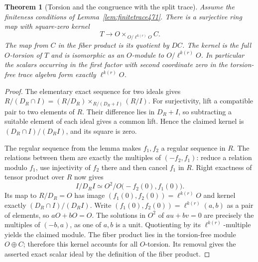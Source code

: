 \documentclass[a4paper,11pt]{article}
\newtheorem{theorem}[proposition]{Theorem}
\theoremstyle{definition}
\theoremstyle{remark}
\numberwithin{equation}{section}
\begin{document}
\begin{theorem}[Torsion and the congruence with the split trace]\leavevmode
\label{thm:congruenceorder471}
Assume the finiteness conditions of Lemma~\ref{lem:finitetrace471}.
There is a surjective ring map with square-zero kernel
\[
       T\longrightarrow O\times_{\,O/\ell^{k(r)}O} C .
\]
The map from \(C\) in the fiber product is its quotient by \(DC\).
The kernel is the full \(O\)-torsion of \(T\) and is isomorphic
as an \(O\)-module to \(O/\ell^{k(r)}O\). In particular the
scalars occurring in the first factor with second coordinate zero
in the torsion-free trace algebra form exactly \(\ell^{k(r)}O\).
\end{theorem}
\begin{proof}
The elementary exact sequence for two ideals gives
\(R/(D_R\cap I)=(R/D_R)\times_{R/(D_R+I)}(R/I)\).
For surjectivity, lift a compatible pair to two elements of \(R\).
Their difference lies in \(D_R+I\), so subtracting a suitable
element of each ideal gives a common lift. Hence the claimed
kernel is \((D_R\cap I)/(D_R I)\), and its square is zero.

The regular sequence from the lemma makes \(f_1,f_2\) a regular
sequence in \(R\). The relations between them are exactly the
multiples of \((-f_2,f_1)\): reduce a relation modulo \(f_1\),
use injectivity of \(f_2\) there and then cancel \(f_1\) in \(R\).
Right exactness of tensor product over \(R\) now gives
\[
 I/D_R I \simeq
    O^2/O\big(-f_2(0),f_1(0)\big).
\]
Its map to \(R/D_R=O\) has image \((f_1(0),f_2(0))=\ell^{k(r)}O\)
and kernel exactly \((D_R\cap I)/(D_R I)\). Write
\((f_1(0),f_2(0))=\ell^{k(r)}(a,b)\) as a pair of elements, so
\(aO+bO=O\). The solutions in \(O^2\) of \(au+bv=0\) are precisely
the multiples of \((-b,a)\), as one of \(a,b\) is a unit. Quotienting
by its \(\ell^{k(r)}\)-multiple yields the claimed module. The
fiber product lies in the torsion-free module \(O\oplus C\);
therefore this kernel accounts for all \(O\)-torsion. Its removal
gives the asserted exact scalar ideal by the definition of the
fiber product.
\end{proof}
\end{document}
